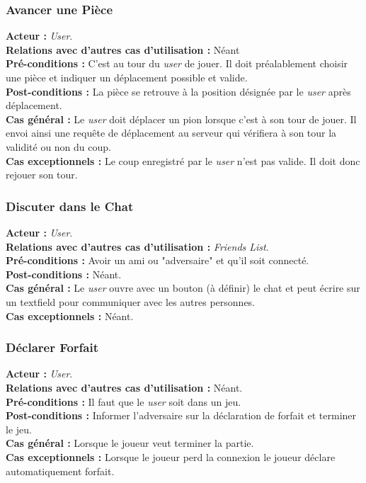 \documentclass[10pt, a4paper]{article}
\begin{document}
\subsubsection{Avancer une Pièce}
\textbf{Acteur :} \textit{User}.\\
\textbf{Relations avec d'autres cas d'utilisation :} Néant \\
\textbf{Pré-conditions :} C'est au tour du \textit{user} de jouer. Il doit préalablement choisir une pièce et indiquer un déplacement possible et valide. \\
\textbf{Post-conditions :} La pièce se retrouve à la position désignée par le \textit{user} après déplacement. \\
\textbf{Cas général :} Le \textit{user} doit déplacer un pion lorsque c'est à son tour de jouer. Il envoi ainsi une requête de déplacement au serveur qui vérifiera à son tour la validité ou non du coup. \\
\textbf{Cas exceptionnels :} Le coup enregistré par le \textit{user} n'est pas valide. Il doit donc rejouer son tour. \\

\subsubsection{Discuter dans le Chat}
\textbf{Acteur :} \textit{User}.\\
\textbf{Relations avec d'autres cas d'utilisation :} \textit{Friends List}.\\
\textbf{Pré-conditions :} Avoir un ami ou "adversaire" et qu'il soit connecté.\\
\textbf{Post-conditions :} Néant.\\
\textbf{Cas général :} Le \textit{user} ouvre avec un bouton (à définir) le chat et peut écrire sur un textfield pour communiquer avec les autres personnes.\\ %
\textbf{Cas exceptionnels :} Néant.

\subsubsection{Déclarer Forfait}
\textbf{Acteur :} \textit{User}.\\
\textbf{Relations avec d'autres cas d'utilisation :} Néant.\\
\textbf{Pré-conditions :} Il faut que le \textit{user} soit dans un jeu. \\
\textbf{Post-conditions :} Informer l'adversaire sur la déclaration de forfait et terminer le jeu.\\
\textbf{Cas général :} Lorsque le joueur veut terminer la partie.\\
\textbf{Cas exceptionnels :} Lorsque le joueur perd la connexion le joueur déclare automatiquement forfait. %
\end{document}
